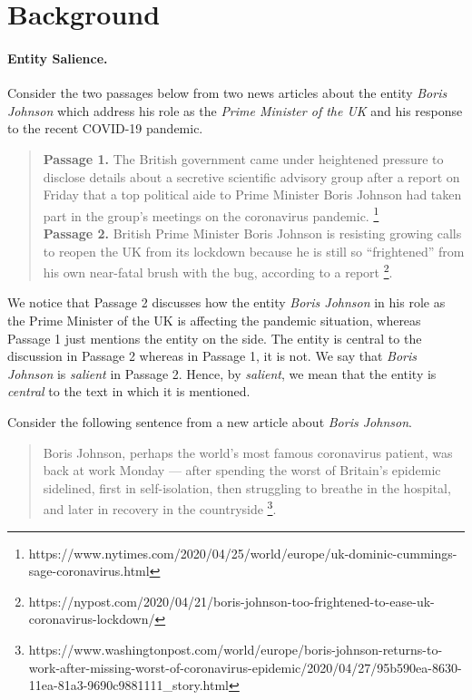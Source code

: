 \section{Background}
\label{sec:background}



\paragraph{\textbf{Entity Salience.}} 
Consider the two passages below from two news articles about the entity \textit{Boris Johnson} which address his role as the \textit{Prime Minister of the UK} and his response to the recent COVID-19 pandemic.
\begin{quote}
\textbf{Passage 1.} The British government came under heightened pressure to disclose details about a secretive scientific advisory group after a report on Friday that a top political aide to Prime Minister Boris Johnson had taken part in the group’s meetings on the coronavirus pandemic. \footnote{https://www.nytimes.com/2020/04/25/world/europe/uk-dominic-cummings-sage-coronavirus.html}\\
\textbf{Passage 2.} British Prime Minister Boris Johnson is resisting growing calls to reopen the UK from its lockdown because he is still so “frightened” from his own near-fatal brush with the bug, according to a report \footnote{https://nypost.com/2020/04/21/boris-johnson-too-frightened-to-ease-uk-coronavirus-lockdown/}.
\end{quote}
We notice that Passage 2 discusses how the entity \textit{Boris Johnson} in his role as the Prime Minister of the UK is affecting the pandemic situation, whereas Passage 1 just mentions the entity on the side. The entity is central to the discussion in Passage 2 whereas in Passage 1, it is not. We say that \textit{Boris Johnson} is \textit{salient} in Passage 2. Hence, by \textit{salient}, we mean that the entity is \textit{central} to the text in which it is mentioned. 

Consider the following sentence from a new article about \textit{Boris Johnson}.

\begin{quote}
    Boris Johnson, perhaps the world's most famous coronavirus patient, was back at work Monday — after spending the worst of Britain's epidemic sidelined,
first in self-isolation, then struggling to breathe in the hospital, and later in recovery in the countryside \footnote{https://www.washingtonpost.com/world/europe/boris-johnson-returns-to-work-after-missing-worst-of-coronavirus-epidemic/2020/04/27/95b590ea-8630-11ea-81a3-9690c9881111_story.html}.
\end{quote}

